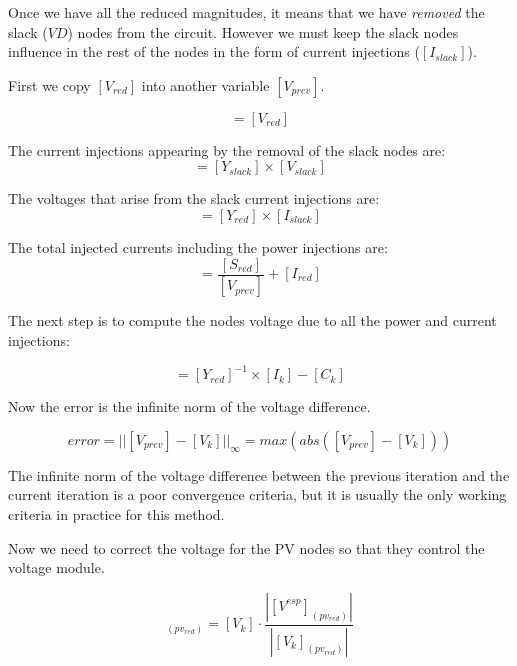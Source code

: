 \documentclass[nols,a4paper,twoside,notoc,fleqn]{tufte-book}
\begin{document}
Once we have all the reduced magnitudes, it means that we have \textit{removed} the slack ($VD$) nodes from the circuit. However we must keep the slack nodes influence in the rest of the nodes in the form of current injections ($[I_{slack}]$).

First we copy $[V_{red}]$ into another variable $[V_{prev}]$.

\begin{equation}
[V_{prev}] = [V_{red}]
\end{equation}

The current injections appearing by the removal of the slack nodes are:
\begin{equation}
[I_{slack}] = [Y_{slack}] \times [V_{slack}]
\end{equation}

The voltages that arise from the slack current injections are:
\begin{equation}
[C_k] = [Y_{red}] \times [I_{slack}]
\end{equation}

The total injected currents including the power injections are:
\begin{equation}
[I_k] = \frac{[S_{red}]}{[V_{prev}]} + [I_{red}]
\label{eq:zm_ik}
\end{equation}

The next step is to compute the nodes voltage due to all the power and current injections:

\begin{equation}
[V_k] = [Y_{red}]^{-1} \times [I_k] - [C_k]
\end{equation}


Now the error is the infinite norm of the voltage difference.

\begin{equation}
error = ||[V_{prev}] - [V_k] ||_{\infty} = max(abs([V_{prev}] - [V_k] ))
\end{equation}

The infinite norm of the voltage difference between the previous iteration and the current iteration is a poor convergence criteria, but it is usually the only working criteria in practice for this method.

Now we need to correct the voltage for the PV nodes so that they control the voltage module.

\begin{equation}
[V_k]_{ (pv_{red})} = [V_k] \cdot \frac{|[V^{esp}]_{(pv_{red})}|}{|[V_k]_{(pv_{red})}|}
\label{eq:zm_pv_correction}
\end{equation}
\end{document}
